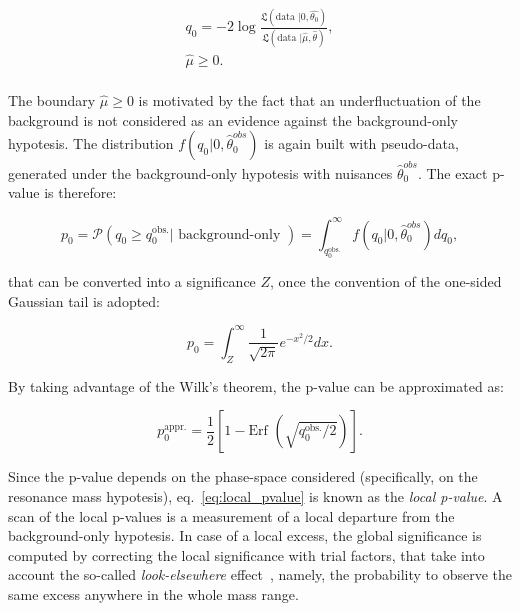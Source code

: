 \begin{equation}
\begin{gathered}
{q}_{0} = -2 \log { \frac{\mathfrak{L} (\text{data }| 0, \hat{\theta_{0}}) }{ \mathfrak{L} (\text{data }| \hat{\mu}, \hat{\theta})  } },\\
\hat{\mu} \geq 0.\\
\end{gathered}
\end{equation}

\noindent The boundary $\hat{\mu} \geq 0$ is motivated by the fact that an underfluctuation of the background is not considered as an evidence against the background-only hypotesis. The distribution $f (q_0 | 0, \hat{\theta}_0^{obs})$ is again built with pseudo-data, generated under the background-only hypotesis with nuisances $\hat{\theta}_0^{obs}$. The exact p-value is therefore:

\begin{equation}
p_0 = \mathcal{P} \left( q_0 \geq q_0^{\text{obs.}} | \text{ background-only } \right) = \int_{q_0^{\text{obs.}}}^{\infty} f (q_0 | 0, \hat{\theta}_0^{obs}) d q_0,
\label{eq:local_pvalue}
\end{equation}

\noindent that can be converted into a significance $Z$, once the convention of the one-sided Gaussian tail is adopted:

\begin{equation}
p_0 = \int_Z^{\infty} \frac{1}{\sqrt{2 \pi}} e^{-x^2/2} dx.
\end{equation} 

\noindent By taking advantage of the Wilk's theorem, the p-value can be approximated as:

\begin{equation}
p_0^{\text{appr.}} = \frac{1}{2} \left[ 1 - \text{Erf } \left( \sqrt{q_0^{\text{obs.}}/2}\right) \right].
\end{equation} 

\noindent Since the p-value depends on the phase-space considered (specifically, on the resonance mass hypotesis), eq.~\ref{eq:local_pvalue} is known as the \emph{local p-value}. A scan of the local p-values is a measurement of a local departure from the background-only hypotesis. In case of a local excess, the global significance is computed by correcting the local significance with trial factors, that take into account the so-called \emph{look-elsewhere} effect~\cite{Gross2010}, namely, the probability to observe the same excess anywhere in the whole mass range.

